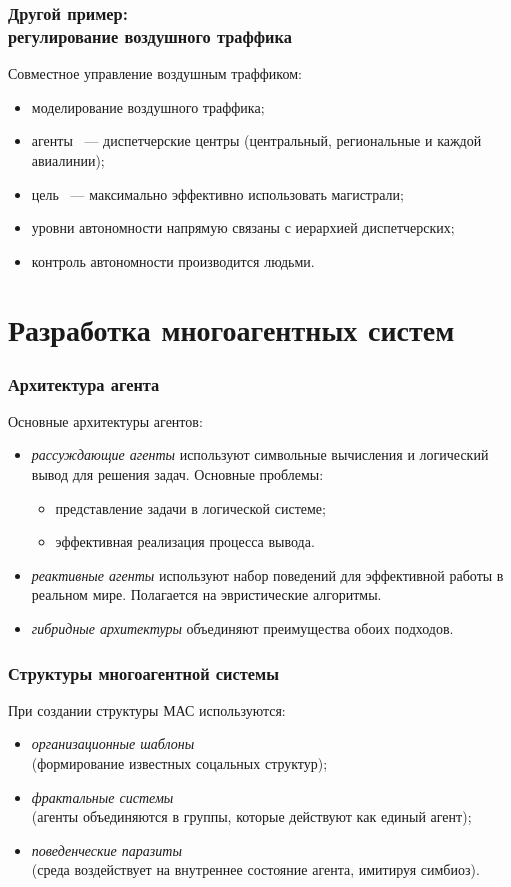 \documentclass{beamer}
\begin{document}
\begin{frame}
  \frametitle{Другой пример: \\ регулирование воздушного траффика}
  Совместное управление воздушным траффиком:
  \begin{itemize}
    \item моделирование воздушного траффика;
    \item агенты ~--- диспетчерские центры (центральный, региональные и каждой авиалинии);
    \item цель ~--- максимально эффективно использовать магистрали;
    \item уровни автономности напрямую связаны с иерархией диспетчерских;
    \item контроль автономности производится людьми.
  \end{itemize}
\end{frame}

\section{Разработка многоагентных систем}

\begin{frame}
  \frametitle{Архитектура агента}
  Основные архитектуры агентов:
  \begin{itemize}
    \item {\it рассуждающие агенты} используют символьные вычисления
      и логический вывод для решения задач. Основные проблемы:
      \begin{itemize}
        \item представление задачи в логической системе;
        \item эффективная реализация процесса вывода.
      \end{itemize}
    \item {\it реактивные агенты} используют набор поведений для
      эффективной работы в реальном мире. Полагается на эвристические
      алгоритмы.
    \item {\it гибридные архитектуры} объединяют преимущества обоих подходов.
  \end{itemize}
\end{frame}

\begin{frame}
  \frametitle{Структуры многоагентной системы}
  При создании структуры МАС используются:
  \begin{itemize}
    \item {\it организационные шаблоны} \\
      (формирование известных соцальных структур);
    \item {\it фрактальные системы} \\
      (агенты объединяются в группы, которые действуют как единый агент);
    \item {\it поведенческие паразиты} \\
      (среда воздействует на внутреннее состояние агента, имитируя симбиоз).
  \end{itemize}
\end{frame}
\end{document}
